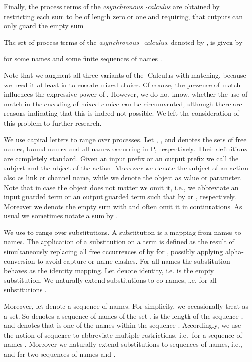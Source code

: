 \documentclass[]{llncs}
\begin{document}
Finally, the process terms  of the \emph{asynchronous \piCal-calculus} \piAsyn \cite{boudol92,hondaTokoro91} are obtained by restricting each sum to be of length zero or one and requiring, that outputs can only guard the empty sum.
 
\begin{definition}[\piAsyn]
  The set of process terms of the \emph{asynchronous \piCal-calculus}, denoted by , is given by
	
	for some names  and some finite sequences of names .
\end{definition}

Note that we augment all three variants of the \piCal-Calculus with matching, because we need it at least in \piAsyn to encode mixed choice. Of course, the presence of match influences the expressive power of \piAsyn. However, we do not know, whether the use of match in the encoding of mixed choice can be circumvented, although there are reasons indicating that this is indeed not possible. We left the consideration of this problem to further research.

We use capital letters  to range over processes. Let , , and  denotes the sets of free names, bound names and all names occurring in P, respectively. Their definitions are completely standard. Given an input prefix  or an output prefix  we call  the subject and  the object of the action. Moreover we denote the subject of an action also as link or channel name, while we denote the object as value or parameter. Note that in case the object does not matter we omit it, i.e., we abbreviate an input guarded term  or an output guarded term  such that  by  or , respectively. Moreover we denote the empty sum with  and often omit it in continuations. As usual we sometimes notate a sum  by .

We use  to range over substitutions. A substitution is a mapping  from names to names. The application of a substitution on a term  is defined as the result of simultaneously replacing all free occurrences of  by  for , possibly applying alpha-conversion to avoid capture or name clashes. For all names  the substitution behaves as the identity mapping. Let  denote identity, i.e.  is the empty substitution. We naturally extend substitutions to co-names, i.e.  for all substitutions .

Moreover, let  denote a sequence of names. For simplicity, we occasionally treat  as a set. So  denotes a sequence of names of the set ,  is the length of the sequence , and  denotes that  is one of the names within the sequence . Accordingly, we use the notion of sequence to abbreviate multiple restrictions, i.e.,  for a sequence of names . Moreover we naturally extend substitutions to sequences of names, i.e.,  and  for two sequences of names  and .
\end{document}
